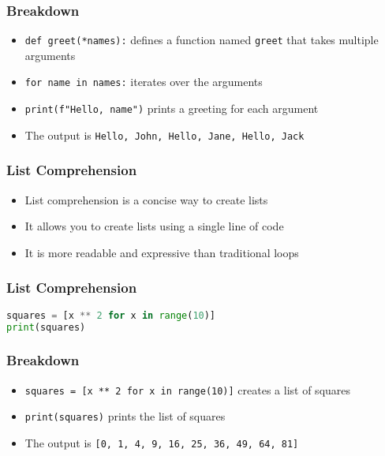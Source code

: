\documentclass[serif, 9pt, aspectratio=32]{beamer}
\begin{document}
\begin{frame}
    \centering
    \frametitle{Breakdown}
    \begin{itemize}
        \setlength{\itemsep}{2em}
        \item \texttt{def greet(*names):} defines a function named \texttt{greet} that takes multiple arguments
        \item \texttt{for name in names:} iterates over the arguments
        \item \texttt{print(f"Hello, {name}")} prints a greeting for each argument
        \item The output is \texttt{Hello, John, Hello, Jane, Hello, Jack}
    \end{itemize}
\end{frame}

\begin{frame}
    \centering
    \frametitle{List Comprehension}
    \begin{itemize}
        \setlength{\itemsep}{2em}
        \item List comprehension is a concise way to create lists
        \item It allows you to create lists using a single line of code
        \item It is more readable and expressive than traditional loops
    \end{itemize}
\end{frame}

\begin{frame}[fragile]
    \frametitle{List Comprehension}
    \begin{lstlisting}[language=Python]
squares = [x ** 2 for x in range(10)]
print(squares)
    \end{lstlisting}
\end{frame}

\begin{frame}
    \centering
    \frametitle{Breakdown}
    \begin{itemize}
        \setlength{\itemsep}{2em}
        \item \texttt{squares = [x ** 2 for x in range(10)]} creates a list of squares
        \item \texttt{print(squares)} prints the list of squares
        \item The output is \texttt{[0, 1, 4, 9, 16, 25, 36, 49, 64, 81]}
    \end{itemize}
\end{frame}
\end{document}
